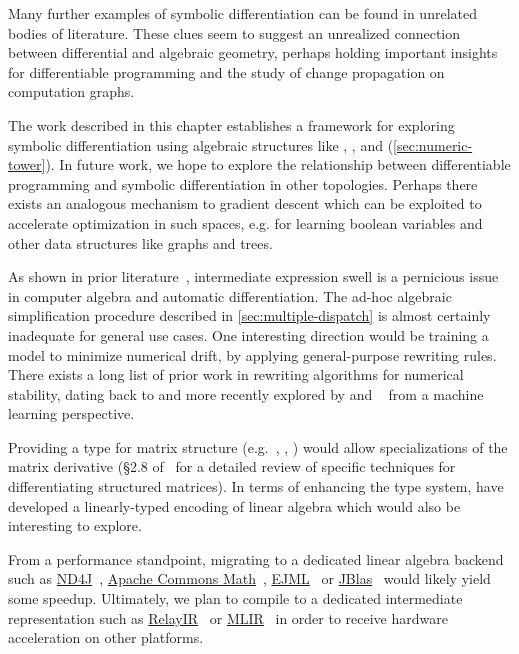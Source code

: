 Many further examples of symbolic differentiation can be found in unrelated bodies of literature. These clues seem to suggest an unrealized connection between differential and algebraic geometry, perhaps holding important insights for differentiable programming and the study of change propagation on computation graphs.

The work described in this chapter establishes a framework for exploring symbolic differentiation using algebraic structures like , , and  (\autoref{sec:numeric-tower}). In future work, we hope to explore the relationship between differentiable programming and symbolic differentiation in other topologies. Perhaps there exists an analogous mechanism to gradient descent which can be exploited to accelerate optimization in such spaces, e.g. for learning boolean variables and other data structures like graphs and trees.

As shown in prior literature~\citep{bergstra2010theano, baydin2015survey, laue2019equivalence}, intermediate expression swell is a pernicious issue in computer algebra and automatic differentiation. The ad-hoc algebraic simplification procedure described in \autoref{sec:multiple-dispatch} is almost certainly inadequate for general use cases. One interesting direction would be training a model to minimize numerical drift, by applying general-purpose rewriting rules. There exists a long list of prior work in rewriting algorithms for numerical stability, dating back to \citet{kahan1965summation, dekker1971floating, ogita2005accurate} and more recently explored by \citet{zaremba2014learning, zaremba2016learning} and ~\citet{wang2019global} from a machine learning perspective.

Providing a type for matrix structure (e.g.\ , , ) would allow specializations of the matrix derivative (\S 2.8 of~\citet{petersen2012matrix} for a detailed review of specific techniques for differentiating structured matrices). In terms of enhancing the type system, \citet{makwana2018numlin} have developed a linearly-typed encoding of linear algebra which would also be interesting to explore.

From a performance standpoint, migrating to a dedicated linear algebra backend such as \href{https://deeplearning4j.org/docs/latest/nd4j-overview}{ND4J}~\citep{team2016nd4j}, \href{https://commons.apache.org/proper/commons-math/}{Apache Commons Math}~\citep{developers2012apache}, \href{http://ejml.org}{EJML}~\citep{abeles2010efficient} or \href{http://jblas.org/}{JBlas}~\citep{braun2011jblas} would likely yield some speedup. Ultimately, we plan to compile to a dedicated intermediate representation such as \href{https://docs.tvm.ai/dev/relay_intro.html}{RelayIR}~\citep{roesch2018relay} or \href{https://www.tensorflow.org/mlir}{MLIR}~\citep{mlir} in order to receive hardware acceleration on other platforms.

